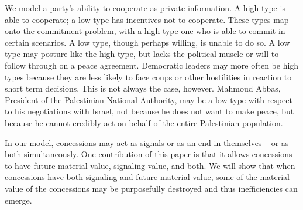 \documentclass[12pt, letterpaper]{article}
\begin{document}



We model a party's ability to cooperate as private information. A high type is able to cooperate; a low type has incentives not to cooperate. These types map onto the commitment problem, with a high type one who is able to commit in certain scenarios. A low type, though perhaps willing, is unable to do so. A low type may posture like the high type, but lacks the political muscle or will to follow through on a peace agreement. Democratic leaders may more often be high types because they are less likely to face coups or other hostilities in reaction to short term decisions. This is not always the case, however. Mahmoud Abbas, President of the Palestinian National Authority, may be a low type with respect to his negotiations with Israel, not because he does not want to make peace, but because he cannot credibly act on behalf of the entire Palestinian population. 

In our model, concessions may act as signals or as an end in themselves -- or as both simultaneously. One contribution of this paper is that it allows concessions to have future material value, signaling value, and both. We will show that when concessions have both signaling and future material value, some of the material value of the concessions may be purposefully destroyed and thus inefficiencies can emerge.
\end{document}
